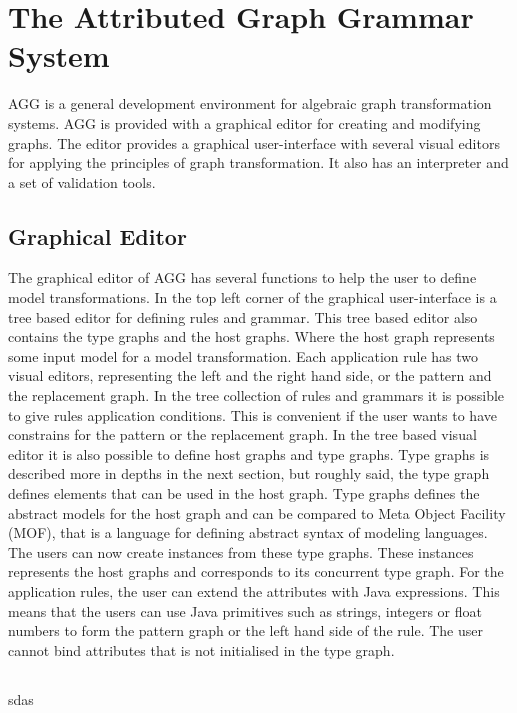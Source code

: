 \documentclass[pdftex,11pt,a4paper]{article}
\begin{document}
\section{The Attributed Graph Grammar System}

AGG is a general development environment for algebraic graph transformation
systems. AGG is provided with a graphical editor for creating and modifying
graphs. The editor provides a graphical user-interface with several visual
editors for applying the principles of graph transformation. It also has an
interpreter and a set of validation tools.

\subsection{Graphical Editor}
The graphical editor of AGG has several functions to help the user to define
model transformations. In the top left corner of the graphical user-interface is
a tree based editor for defining rules and grammar. This tree based editor also
contains the type graphs and the host graphs. Where the host graph represents
some input model for a model transformation.
\indent Each application rule has two visual editors, representing the left and
the right hand side, or the pattern and the replacement graph. In the tree
collection of rules and grammars it is possible to give rules application
conditions. This is convenient if the user wants to have constrains for the
pattern or the replacement graph. 
\indent In the tree based visual editor it is also possible to define host
graphs and type graphs. Type graphs is described more in depths in the next
section, but roughly said, the type graph defines elements that can be used in
the host graph. Type graphs defines the abstract models for the host graph and
can be compared to Meta Object Facility
(MOF)\cite{OMGAdoptedSpecificationptc/03-10-04}, that is a language for defining
abstract syntax of modeling languages. The users can now create instances
from these type graphs. These instances represents the host graphs and
corresponds to its concurrent type graph. 
\indent For the application rules, the user can extend the attributes with Java
expressions. This means that the users can use Java primitives such as strings,
integers or float numbers to form the pattern graph or the left hand side of the
rule. The user cannot bind attributes that is not initialised in the type graph. 

\subsection{}

sdas



\pagebreak
 

\end{document}
